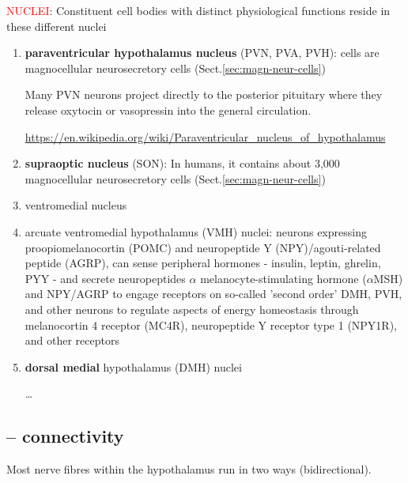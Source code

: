 \textcolor{red}{NUCLEI}: Constituent cell bodies with distinct physiological
functions reside in these different nuclei
\begin{enumerate}
  
    \item {\bf paraventricular hypothalamus nucleus} (PVN, PVA, PVH): cells are
    magnocellular neurosecretory cells (Sect.\ref{sec:magn-neur-cells})

  
   Many PVN neurons project directly to the posterior pituitary where they
   release oxytocin or vasopressin into the general circulation.

\url{https://en.wikipedia.org/wiki/Paraventricular_nucleus_of_hypothalamus}

  \item  {\bf supraoptic nucleus}  (SON): In humans, it contains about 3,000
  magnocellular neurosecretory cells (Sect.\ref{sec:magn-neur-cells})
  
   \item ventromedial nucleus 
   
   \item arcuate ventromedial hypothalamus (VMH) nuclei: neurons expressing
   proopiomelanocortin (POMC) and neuropeptide Y (NPY)/agouti-related peptide
   (AGRP), can sense peripheral hormones - insulin, leptin, ghrelin, PYY - and
   secrete neuropeptides $\alpha$ melanocyte-stimulating hormone ($\alpha$MSH)
   and NPY/AGRP to engage receptors on so-called 'second order' DMH, PVH, and
   other neurons to regulate aspects of energy homeostasis through melanocortin
   4 receptor (MC4R), neuropeptide Y receptor type 1 (NPY1R), and other
   receptors
   
   \item {\bf dorsal medial} hypothalamus (DMH) nuclei 
  
   \ldots
  
\end{enumerate}
\subsection{-- connectivity}
\label{sec:hypothalamus-connectivity}

Most nerve fibres within the hypothalamus run in two ways (bidirectional).

